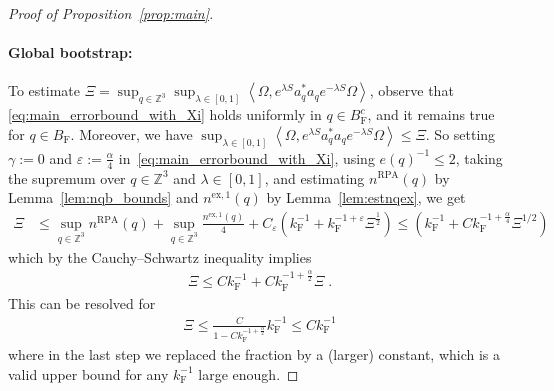 \documentclass[12pt,a4paper]{article}
\numberwithin{equation}{section}
\newcommand{\1}{\mathbb{I}}
\newcommand{\ex}{\mathrm{ex}}
\newcommand{\F}{\mathrm{F}}
\newcommand{\RPA}{\mathrm{RPA}}
\newcommand{\kF}{k_\F}
\newcommand{\Z}{\mathbb{Z}}
\newcommand{\half}{\frac{1}{2}}
\newcommand{\eva}[1]{\left\langle #1 \right\rangle}
\theoremstyle{plain}
\theoremstyle{definition}
\theoremstyle{remark}
\theoremstyle{plain}
\theoremstyle{definition}
\theoremstyle{remark}
\begin{document}
\begin{proof}[Proof of Proposition~\ref{prop:main}]
\paragraph{Global bootstrap:} To estimate $ \Xi = \sup_{q \in \Z^3} \sup_{\lambda \in [0,1]} \eva{\Omega, e^{\lambda S} a_q^* a_q e^{- \lambda S} \Omega} $, observe that \eqref{eq:main_errorbound_with_Xi} holds uniformly in $ q \in B_{\F}^c $, and it remains true for $ q \in B_{\F} $. Moreover, we have  $ \sup_{\lambda \in [0,1]} \eva{\Omega, e^{\lambda S} a_q^* a_q e^{-\lambda S} \Omega} \le \Xi $. So setting $ \gamma := 0 $ and $\varepsilon := \frac{\alpha}{4}$ in~\eqref{eq:main_errorbound_with_Xi}, using $e(q)^{-1} \leq 2$, taking the supremum over $ q \in \Z^3 $ and $ \lambda \in [0,1] $, and estimating $ n^{\RPA}(q) $ by Lemma~\ref{lem:nqb_bounds} and $n^{\ex,1}(q)$ by Lemma~\ref{lem:estnqex}, we get
%
\begin{align} \label{eq:Xibound}
	\Xi
	&\le \sup_{q \in \Z^3} n^{\RPA}(q) + \sup_{q \in \Z^3} \frac{n^{\ex,1}(q)}{4}
		+ C_\varepsilon \left( \kF^{-1}
		+ \kF^{-1 + \varepsilon} \Xi^\half \right)
	\le  \left( \kF^{-1} + C \kF^{-1 + \frac{\alpha}{4}} \Xi^{1/2}
	\right) \nonumber
\end{align}
which by the Cauchy--Schwartz inequality implies
\begin{align}
		\Xi \leq C \kF^{-1} + C \kF^{-1+\frac{\alpha}{2}} \Xi \;.
\end{align}
This can be resolved for
\begin{align}
	\Xi
	 \le \frac{C}{1-C \kF^{-1 + \frac{\alpha}{2}}} \kF^{-1} \leq C \kF^{-1}
\end{align}
where in the last step we replaced the fraction by a (larger) constant, which is a valid upper bound for any $\kF^{-1}$ large enough.

\end{proof}
\end{document}
